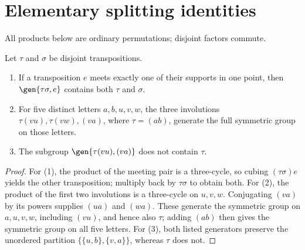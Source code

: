 \section{Elementary splitting identities}
All products below are ordinary permutations; disjoint factors commute.
\begin{lemma}\label{lem:splitting}
Let $\tau$ and $\sigma$ be disjoint transpositions.
\begin{enumerate}
\item If a transposition $e$ meets exactly one of their supports in one
point, then $\gen{\tau\sigma,e}$ contains both $\tau$ and $\sigma$.
\item For five distinct letters $a,b,u,v,w$, the three involutions
$\tau(vu),\tau(vw),(va)$, where $\tau=(ab)$, generate the full
symmetric group on those letters.
\item The subgroup $\gen{\tau(vu),(va)}$ does not contain $\tau$.
\end{enumerate}
\end{lemma}
\begin{proof}
For (1), the product of the meeting pair is a three-cycle, so cubing
$(\tau\sigma)e$ yields the other transposition; multiply back by
$\tau\sigma$ to obtain both. For (2), the product of the first two
involutions is a three-cycle on $u,v,w$. Conjugating $(va)$ by its
powers supplies $(ua)$ and $(wa)$. These generate the symmetric group
on $a,u,v,w$, including $(vu)$, and hence also $\tau$; adding $(ab)$
then gives the symmetric group on all five letters. For (3), both
listed generators preserve the unordered partition
$\{\{u,b\},\{v,a\}\}$, whereas $\tau$ does not.
\end{proof}

